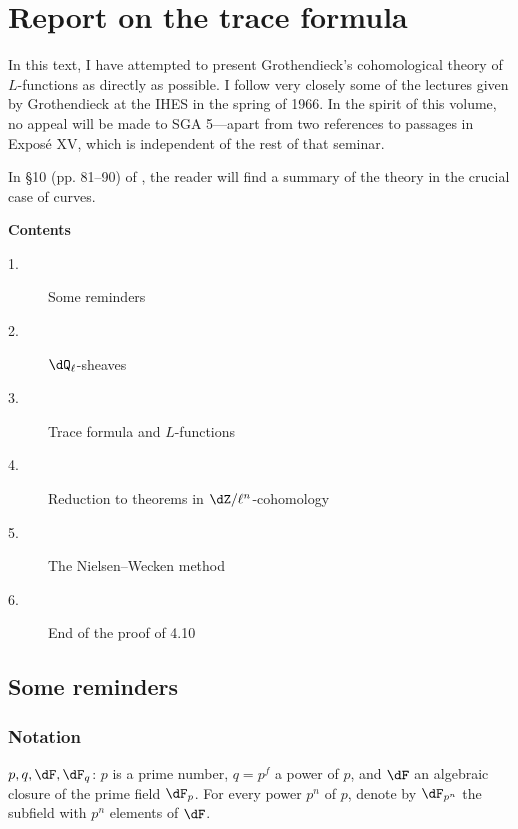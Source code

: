 
\chapter{Report on the trace formula}\label{II}

In this text, I have attempted to present Grothendieck's cohomological theory
of $L$-functions as directly as possible. I follow very closely some of the
lectures given by Grothendieck at the IHES in the spring of 1966. In the
spirit of this volume, no appeal will be made to SGA 5---apart from two
references to passages in Exposé XV, which is independent of the rest of that
seminar.

In \S 10 (pp. 81--90) of \cite{de73}, the reader will find a summary of the
theory in the crucial case of curves.










\begin{center}\textbf{Contents}\end{center}
\begin{description}
\item[1.] Some reminders 
\item[2.] $\dQ_\ell$-sheaves 
\item[3.] Trace formula and $L$-functions 
\item[4.] Reduction to theorems in $\dZ/\ell^n$-cohomology 
\item[5.] The Nielsen--Wecken method 
\item[6.] End of the proof of 4.10 
\end{description}

\section{Some reminders}\label{II:1}





\subsection{Notation}\label{II:1-1}

$p,q,\dF,\dF_q$: $p$ is a prime number, $q=p^f$ a power of $p$, and $\dF$
an algebraic closure of the prime field $\dF_p$. For every power $p^n$ of
$p$, denote by $\dF_{p^n}$ the subfield with $p^n$ elements of $\dF$.

